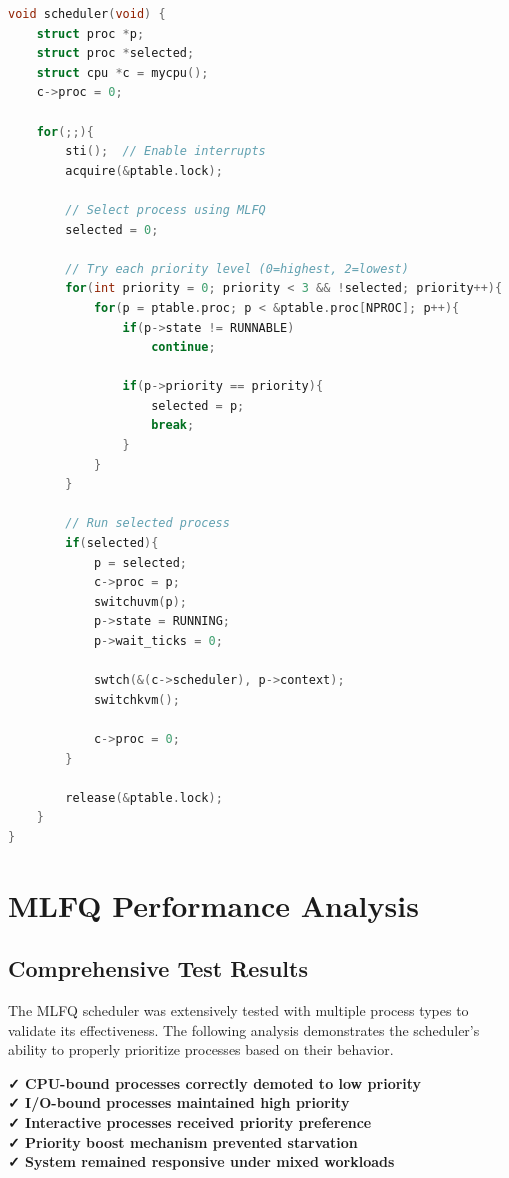 \documentclass[a4paper,12pt]{report}
\begin{document}
\begin{lstlisting}[language=C, caption=MLFQ Scheduler (proc.c)]
void scheduler(void) {
    struct proc *p;
    struct proc *selected;
    struct cpu *c = mycpu();
    c->proc = 0;
    
    for(;;){
        sti();  // Enable interrupts
        acquire(&ptable.lock);
        
        // Select process using MLFQ
        selected = 0;
        
        // Try each priority level (0=highest, 2=lowest)
        for(int priority = 0; priority < 3 && !selected; priority++){
            for(p = ptable.proc; p < &ptable.proc[NPROC]; p++){
                if(p->state != RUNNABLE)
                    continue;
                
                if(p->priority == priority){
                    selected = p;
                    break;
                }
            }
        }
        
        // Run selected process
        if(selected){
            p = selected;
            c->proc = p;
            switchuvm(p);
            p->state = RUNNING;
            p->wait_ticks = 0;
            
            swtch(&(c->scheduler), p->context);
            switchkvm();
            
            c->proc = 0;
        }
        
        release(&ptable.lock);
    }
}
\end{lstlisting}

\section{MLFQ Performance Analysis}

\subsection{Comprehensive Test Results}

The MLFQ scheduler was extensively tested with multiple process types to validate its effectiveness. The following analysis demonstrates the scheduler's ability to properly prioritize processes based on their behavior.

\begin{tcolorbox}[colback=green!5, colframe=green!40, title=\textbf{MLFQ Test Summary - Key Findings}]
\textbf{✓ CPU-bound processes correctly demoted to low priority}\\
\textbf{✓ I/O-bound processes maintained high priority}\\
\textbf{✓ Interactive processes received priority preference}\\
\textbf{✓ Priority boost mechanism prevented starvation}\\
\textbf{✓ System remained responsive under mixed workloads}
\end{tcolorbox}
\end{document}
